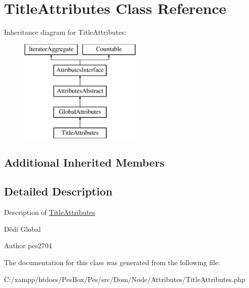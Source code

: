 \hypertarget{class_pes_1_1_dom_1_1_node_1_1_attributes_1_1_title_attributes}{}\section{Title\+Attributes Class Reference}
\label{class_pes_1_1_dom_1_1_node_1_1_attributes_1_1_title_attributes}
Inheritance diagram for Title\+Attributes\+:\begin{figure}[H]
\begin{center}
\leavevmode
\includegraphics[height=5.000000cm]{class_pes_1_1_dom_1_1_node_1_1_attributes_1_1_title_attributes}
\end{center}
\end{figure}
\subsection*{Additional Inherited Members}


\subsection{Detailed Description}
Description of \mbox{\hyperlink{class_pes_1_1_dom_1_1_node_1_1_attributes_1_1_title_attributes}{Title\+Attributes}}

Dědí Global

\begin{DoxyAuthor}{Author}
pes2704 
\end{DoxyAuthor}


The documentation for this class was generated from the following file\+:\begin{DoxyCompactItemize}
\item 
C\+:/xampp/htdocs/\+Pes\+Box/\+Pes/src/\+Dom/\+Node/\+Attributes/Title\+Attributes.\+php\end{DoxyCompactItemize}
